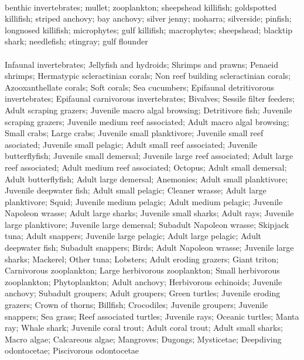 \fullhline
\hline
{} \\
\hline
benthic invertebrates; mullet; zooplankton; sheepshead killifish; goldspotted killifish; striped anchovy; bay anchovy; silver jenny; moharra; silverside; pinfish; longnosed killifish; microphytes; gulf killifish; macrophytes; sheepshead; blacktip shark; needlefish; stingray; gulf flounder\\
\fullhline
\hline
{} \\
\hline
Infaunal invertebrates; Jellyfish and hydroids; Shrimps and prawns; Penaeid shrimps; Hermatypic scleractinian corals; Non reef building scleractinian corals; Azooxanthellate corals; Soft corals; Sea cucumbers; Epifaunal detritivorous invertebrates; Epifaunal carnivorous invertebrates; Bivalves; Sessile filter feeders; Adult scraping grazers; Juvenile macro algal browsing; Detritivore fish; Juvenile scraping grazers; Juvenile medium reef associated; Adult macro algal browsing; Small crabs; Large crabs; Juvenile small planktivore; Juvenile small reef asociated; Juvenile small pelagic; Adult small reef associated; Juvenile butterflyfish; Juvenile small demersal; Juvenile large reef associated; Adult large reef associated; Adult medium reef associated; Octopus; Adult small demersal; Adult butterflyfish; Adult large demersal; Anemonies; Adult small planktivore; Juvenile deepwater fish; Adult small pelagic; Cleaner wrasse; Adult large planktivore; Squid; Juvenile medium pelagic; Adult medium pelagic; Juvenile Napoleon wrasse; Adult large sharks; Juvenile small sharks; Adult rays; Juvenile large planktivore; Juvenile large demersal; Subadult Napoleon wrasse; Skipjack tuna; Adult snappers; Juvenile large pelagic; Adult large pelagic; Adult deepwater fish; Subadult snappers; Birds; Adult Napoleon wrasse; Juvenile large sharks; Mackerel; Other tuna; Lobsters; Adult eroding grazers; Giant triton; Carnivorous zooplankton; Large herbivorous zooplankton; Small herbivorous zooplankton; Phytoplankton; Adult anchovy; Herbivorous echinoids; Juvenile anchovy; Subadult groupers; Adult groupers; Green turtles; Juvenile eroding grazers; Crown of thorns; Billfish; Crocodiles; Juvenile groupers; Juvenile snappers; Sea grass; Reef associated turtles; Juvenile rays; Oceanic turtles; Manta ray; Whale shark; Juvenile coral trout; Adult coral trout; Adult small sharks; Macro algae; Calcareous algae; Mangroves; Dugongs; Mysticetae; Deepdiving odontocetae; Piscivorous odontocetae\\
